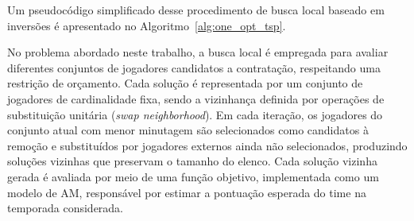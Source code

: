 Um pseudocódigo simplificado desse procedimento de busca local baseado em inversões é apresentado no 
Algoritmo~\ref{alg:one_opt_tsp}.

No problema abordado neste trabalho, a busca local é empregada para avaliar diferentes conjuntos de jogadores candidatos a contratação, respeitando 
uma restrição de orçamento. Cada solução é representada por um conjunto de jogadores de cardinalidade fixa, sendo a vizinhança definida por operações de 
substituição unitária (\textit{swap neighborhood}). Em cada iteração, os jogadores do conjunto atual com menor minutagem são selecionados como candidatos 
à remoção e substituídos por jogadores externos ainda não selecionados, produzindo soluções vizinhas que preservam o tamanho do elenco. 
Cada solução vizinha gerada é avaliada por meio de uma função objetivo, implementada como um modelo de AM, responsável por 
estimar a pontuação esperada do time na temporada considerada.

